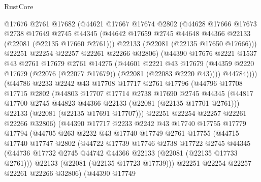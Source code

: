 \begin{lexlean}{RustCore}
\begin{coremodule}
              @17676
              @2761
              @17682
              (@44621
                @17667
                @17674
                @2802
                (@44628
                  @17666
                  @17673
                  @2738
                  @17649
                  @2745
                  @44345
                  (@44642 @17659 @2745 @44648 @44366 @22133 (@22081 (@22135 @17660 @2761)))
                  @22133
                  (@22081 (@22135 @17650 @17666)))
                @22251
                @22254
                @22257
                @22261
                @22266
                @32806)
              (@44390
                @17676
                @2221
                @1537
                @43
                @2761
                @17679
                @2761
                @14275
                (@44601
                  @2221
                  @43
                  @17679
                  (@44359 @2220 @17679 (@22076 (@22077 @17679)) (@22081 (@22083 @2220 @43))))
                @44784))))
        (@44786
          @2233
          @2242
          @43
          @17708
          @17717
          @2761
          @17796
          (@44796
            @17708
            @17715
            @2802
            (@44803
              @17707
              @17714
              @2738
              @17690
              @2745
              @44345
              (@44817 @17700 @2745 @44823 @44366 @22133 (@22081 (@22135 @17701 @2761)))
              @22133
              (@22081 (@22135 @17691 @17707)))
            @22251
            @22254
            @22257
            @22261
            @22266
            @32806)
          (@44390
            @17717
            @2233
            @2242
            @43
            @17740
            @17755
            @17779
            @17794
            (@44705
              @263
              @2232
              @43
              @17740
              @17749
              @2761
              @17755
              (@44715
                @17740
                @17747
                @2802
                (@44722
                  @17739
                  @17746
                  @2738
                  @17722
                  @2745
                  @44345
                  (@44736 @17732 @2745 @44742 @44366 @22133 (@22081 (@22135 @17733 @2761)))
                  @22133
                  (@22081 (@22135 @17723 @17739)))
                @22251
                @22254
                @22257
                @22261
                @22266
                @32806)
              (@44390
                @17749

\end{coremodule}
\end{lexlean}
